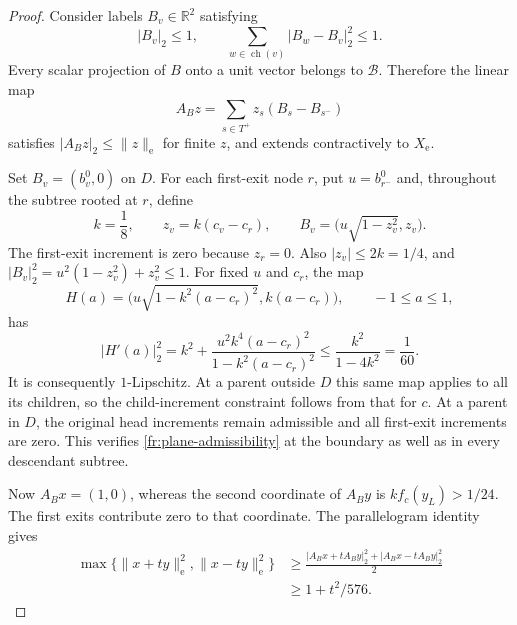 \begin{proof}
Consider labels $B_v\in\mathbb R^2$ satisfying
\begin{equation}
 |B_v|_2\le1,\qquad
 \sum_{w\in\operatorname{ch}(v)}|B_w-B_v|_2^2\le1.
 \label{fr:plane-admissibility}
\end{equation}
Every scalar projection of $B$ onto a unit vector belongs to
$\mathcal B$.  Therefore the linear map
\[
 A_Bz=\sum_{s\in T^+}z_s(B_s-B_{s^-})
\]
satisfies $|A_Bz|_2\le\|z\|_{\mathrm e}$ for finite $z$, and extends
contractively to $X_{\mathrm e}$.

Set $B_v=(b^0_v,0)$ on $D$.  For each first-exit node $r$, put
$u=b^0_{r^-}$ and, throughout the subtree rooted at $r$, define
\begin{equation}
 k=\frac18,\qquad z_v=k(c_v-c_r),\qquad
 B_v=\bigl(u\sqrt{1-z_v^2},z_v\bigr).
 \label{fr:plane-extension}
\end{equation}
The first-exit increment is zero because $z_r=0$.
Also $|z_v|\le2k=1/4$, and
$|B_v|_2^2=u^2(1-z_v^2)+z_v^2\le1$.
For fixed $u$ and $c_r$, the map
\[
 H(a)=\bigl(u\sqrt{1-k^2(a-c_r)^2},k(a-c_r)\bigr),
 \qquad -1\le a\le1,
\]
has
\begin{equation}
 |H'(a)|_2^2
 =k^2+\frac{u^2k^4(a-c_r)^2}{1-k^2(a-c_r)^2}
 \le\frac{k^2}{1-4k^2}=\frac1{60}.
 \label{fr:plane-lipschitz}
\end{equation}
It is consequently $1$-Lipschitz.  At a parent outside $D$ this same
map applies to all its children, so the child-increment constraint
follows from that for $c$.  At a parent in $D$, the original head
increments remain admissible and all first-exit increments are zero.
This verifies \eqref{fr:plane-admissibility} at the boundary as well
as in every descendant subtree.

Now $A_Bx=(1,0)$, whereas the second coordinate of $A_By$ is
$k f_c(y_L)>1/24$.  The first exits contribute zero to that coordinate.
The parallelogram identity gives
\begin{align}
 \max\{\|x+ty\|_{\mathrm e}^2,\|x-ty\|_{\mathrm e}^2\}
 &\ge\frac{|A_Bx+tA_By|_2^2+|A_Bx-tA_By|_2^2}{2}\\
 &\ge1+t^2/576.
 \label{fr:deep}
\end{align}


\end{proof}
